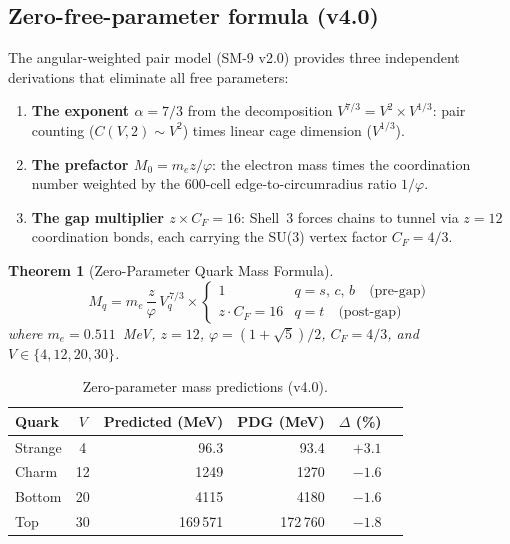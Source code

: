 \documentclass[11pt,letterpaper]{article}
\newtheorem{theorem}{Theorem}[section]
\newcommand{\phig}{\varphi}
\begin{document}
\subsection{Zero-free-parameter formula (v4.0)}
\label{sec:zero_param}

The angular-weighted pair model (SM-9 v2.0) provides three
independent derivations that eliminate all free parameters:

\begin{enumerate}
\item \textbf{The exponent $\alpha = 7/3$} from the decomposition
  $V^{7/3} = V^2 \times V^{1/3}$: pair counting ($C(V,2) \sim V^2$)
  times linear cage dimension ($V^{1/3}$).
\item \textbf{The prefactor $M_0 = m_e z / \phig$}: the electron mass
  times the coordination number weighted by the 600-cell
  edge-to-circumradius ratio $1/\phig$.
\item \textbf{The gap multiplier $z \times C_F = 16$}: Shell~3
  forces chains to tunnel via $z = 12$ coordination bonds, each
  carrying the SU(3) vertex factor $C_F = 4/3$.
\end{enumerate}

\begin{theorem}[Zero-Parameter Quark Mass Formula]
\label{thm:mass_v4}
\begin{equation}
\boxed{
  M_q = m_e \,\frac{z}{\phig}\, V_q^{\,7/3}
  \times
  \begin{cases}
    1 & q = s,\, c,\, b \quad\text{(pre-gap)}\\[4pt]
    z \cdot C_F = 16 & q = t \quad\text{(post-gap)}
  \end{cases}
}
\label{eq:mass_v4}
\end{equation}
where $m_e = 0.511$~MeV, $z = 12$, $\phig = (1+\sqrt{5})/2$,
$C_F = 4/3$, and $V \in \{4, 12, 20, 30\}$.
\end{theorem}

\begin{table}[H]
\centering
\caption{Zero-parameter mass predictions (v4.0).}
\label{tab:mass_v4}
\begin{tabular}{lcrrrr}
\toprule
Quark & $V$ & Predicted (MeV) & PDG (MeV) & $\Delta$ (\%) \\
\midrule
Strange & 4  &   96.3 &   93.4 & $+3.1$ \\
Charm   & 12 & 1249   & 1270   & $-1.6$ \\
Bottom  & 20 & 4115   & 4180   & $-1.6$ \\
Top     & 30 & 169\,571 & 172\,760 & $-1.8$ \\
\bottomrule
\end{tabular}
\end{table}
\end{document}
